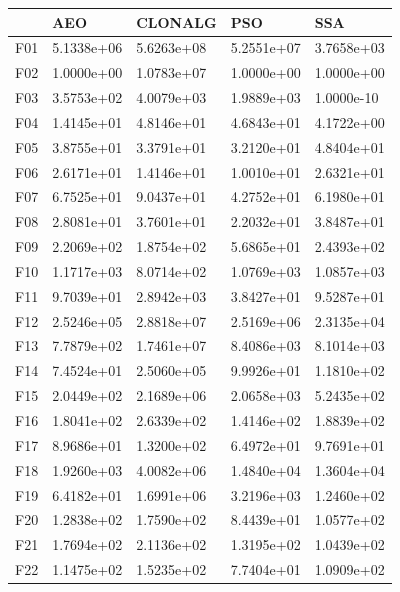 \documentclass[10pt,a4paper]{article}
\begin{document}
\begin{table}[H]
\begin{center}
	\begin{tabular}{lllll}
		
		\toprule
		{} &         AEO &       CLONALG &         PSO &         SSA \\
		\midrule
		F01  &  5.1338e+06 &  5.6263e+08 &  5.2551e+07 &  3.7658e+03 \\
		F02  &  1.0000e+00 &  1.0783e+07 &  1.0000e+00 &  1.0000e+00 \\
		F03  &  3.5753e+02 &  4.0079e+03 &  1.9889e+03 &  1.0000e-10 \\
		F04  &  1.4145e+01 &  4.8146e+01 &  4.6843e+01 &  4.1722e+00 \\
		F05  &  3.8755e+01 &  3.3791e+01 &  3.2120e+01 &  4.8404e+01 \\
		F06  &  2.6171e+01 &  1.4146e+01 &  1.0010e+01 &  2.6321e+01 \\
		F07  &  6.7525e+01 &  9.0437e+01 &  4.2752e+01 &  6.1980e+01 \\
		F08  &  2.8081e+01 &  3.7601e+01 &  2.2032e+01 &  3.8487e+01 \\
		F09  &  2.2069e+02 &  1.8754e+02 &  5.6865e+01 &  2.4393e+02 \\
		F10  &  1.1717e+03 &  8.0714e+02 &  1.0769e+03 &  1.0857e+03 \\
		F11  &  9.7039e+01 &  2.8942e+03 &  3.8427e+01 &  9.5287e+01 \\
		F12  &  2.5246e+05 &  2.8818e+07 &  2.5169e+06 &  2.3135e+04 \\
		F13  &  7.7879e+02 &  1.7461e+07 &  8.4086e+03 &  8.1014e+03 \\
		F14  &  7.4524e+01 &  2.5060e+05 &  9.9926e+01 &  1.1810e+02 \\
		F15  &  2.0449e+02 &  2.1689e+06 &  2.0658e+03 &  5.2435e+02 \\
		F16  &  1.8041e+02 &  2.6339e+02 &  1.4146e+02 &  1.8839e+02 \\
		F17  &  8.9686e+01 &  1.3200e+02 &  6.4972e+01 &  9.7691e+01 \\
		F18  &  1.9260e+03 &  4.0082e+06 &  1.4840e+04 &  1.3604e+04 \\
		F19  &  6.4182e+01 &  1.6991e+06 &  3.2196e+03 &  1.2460e+02 \\
		F20  &  1.2838e+02 &  1.7590e+02 &  8.4439e+01 &  1.0577e+02 \\
		F21  &  1.7694e+02 &  2.1136e+02 &  1.3195e+02 &  1.0439e+02 \\
		F22  &  1.1475e+02 &  1.5235e+02 &  7.7404e+01 &  1.0909e+02 \\

\end{tabular}
\end{center}
\end{table}
\end{document}
